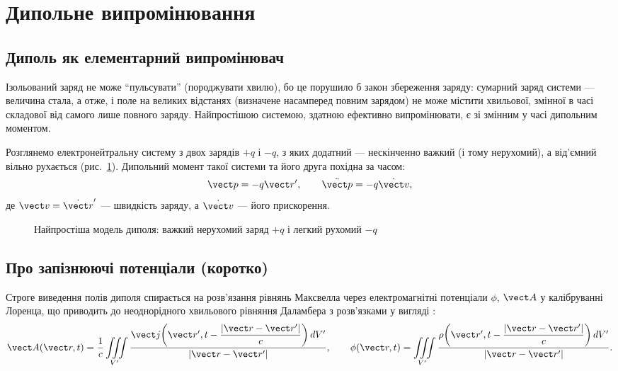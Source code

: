 \section{Дипольне випромінювання}

\subsection*{Диполь як елементарний випромінювач}

\begin{Attention}
	 Ізольований заряд не може \enquote{пульсувати} (породжувати хвилю), бо це порушило б закон
	збереження заряду: сумарний заряд системи --- величина стала, а отже, і поле на великих відстанях (визначене насамперед повним зарядом) не
	може містити хвильової, змінної в часі складової від самого лише повного заряду. Найпростішою системою, здатною ефективно випромінювати, є
	 зі змінним у часі дипольним моментом.
\end{Attention}

Розглянемо електронейтральну систему з двох зарядів $+q$ і $-q$, з яких додатний --- нескінченно важкий (і тому нерухомий), а від'ємний вільно
рухається (рис.~\ref{pic:DipoleTwoCharges}). Дипольний момент такої системи та його друга похідна за часом:
\begin{equation*}
	\vect p = -q\vect r', \qquad \ddot{\vect p} = -q\dot{\vect v},
\end{equation*}
де $\vect v=\dot{\vect r}'$ --- швидкість заряду, а $\dot{\vect v}$ --- його прискорення.

\begin{figure}[h!]\centering
	\caption{Найпростіша модель диполя: важкий нерухомий заряд $+q$ і легкий рухомий $-q$\label{pic:DipoleTwoCharges}}
\end{figure}

\subsection*{Про запізнюючі потенціали (коротко)}

Строге виведення полів диполя спирається на розв'язання рівнянь Максвелла через електромагнітні потенціали $\phi$, $\vect A$ у калібруванні
Лоренца, що приводить до неоднорідного хвильового рівняння Даламбера з розв'язками у вигляді :
\begin{equation*}
	\vect A(\vect r, t)= \frac1c \iiint\limits_{V'} \frac{\vect j\!\left(\vect r', t - \dfrac{|\vect r-\vect r'|}{c}\right) dV'}{|\vect r-\vect
	r'|}, \qquad \phi(\vect r, t) = \iiint\limits_{V'} \frac{\rho\!\left(\vect r', t - \dfrac{|\vect r-\vect r'|}{c}\right) dV'}{|\vect r-\vect
	r'|}.
\end{equation*}

